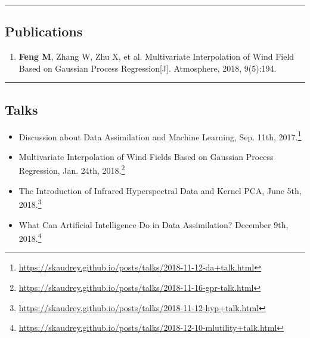 \documentclass[10pt,letterpaper]{article}
\begin{document}
\hrule
\vspace{-0.4em}
\subsection*{Publications}

\begin{enumerate}
	\parskip=0.1em
	
	\item \textbf{Feng M}, Zhang W, Zhu X, et al. Multivariate Interpolation of Wind Field Based on Gaussian Process Regression[J]. Atmosphere, 2018, 9(5):194.
	
%	

\end{enumerate}

\hrule
\vspace{-0.4em}
\subsection*{Talks}

\begin{itemize}
	\parskip=0.1em
	
	\item Discussion about Data Assimilation and Machine Learning, Sep. 11th, 2017.\footnote{\url{https://skaudrey.github.io/posts/talks/2018-11-12-da+talk.html}}

	\item Multivariate Interpolation of Wind Fields Based on Gaussian Process Regression, Jan. 24th, 2018.\footnote{\url{https://skaudrey.github.io/posts/talks/2018-11-16-gpr-talk.html}}
	
	\item The Introduction of Infrared Hyperspectral Data and Kernel PCA, June 5th, 2018.\footnote{\url{https://skaudrey.github.io/posts/talks/2018-11-12-hyp+talk.html}}

	\item What Can Artificial Intelligence Do in Data Assimilation? December 9th, 2018.\footnote{\url{https://skaudrey.github.io/posts/talks/2018-12-10-mlutility+talk.html}}
	
\end{itemize}
\end{document}
